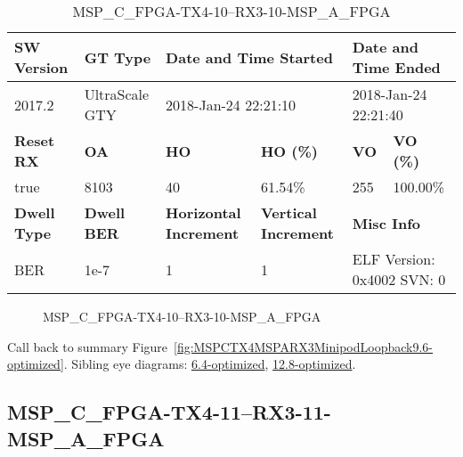 \begin{table}[h]
\centering
\caption{MSP\_C\_FPGA-TX4-10--RX3-10-MSP\_A\_FPGA}
\label{tab:MSPCFPGATX410RX310MSPAFPGA9.6-optimized}
\begin{tabular}{@{}|l|l|l|l|l|l|@{}}
\toprule
\textbf{SW Version}                & \textbf{GT Type}   & \multicolumn{2}{l|}{\textbf{Date and Time Started}}            & \multicolumn{2}{l|}{\textbf{Date and Time Ended}}        \\ \midrule
2017.2                       & UltraScale GTY          & \multicolumn{2}{l|}{2018-Jan-24 22:21:10}                   & \multicolumn{2}{l|}{2018-Jan-24 22:21:40}               \\ \midrule
\textbf{Reset RX}                  & \textbf{OA} & \textbf{HO}   & \textbf{HO (\%)} & \textbf{VO} & \textbf{VO (\%)} \\ \midrule
true & 8103        & 40          & 61.54\%        & 255        & 100.00\%       \\ \midrule
\textbf{Dwell Type}                & \textbf{Dwell BER} & \textbf{Horizontal Increment} & \textbf{Vertical Increment}    & \multicolumn{2}{l|}{\textbf{Misc Info}}                  \\ \midrule
BER                            & 1e-7        & 1        & 1           & \multicolumn{2}{l|}{ELF Version: 0x4002 SVN: 0}                         \\ \bottomrule
\end{tabular}
\end{table}

\begin{figure}[h]
\caption{MSP\_C\_FPGA-TX4-10--RX3-10-MSP\_A\_FPGA} \label{fig:MSPCFPGATX410RX310MSPAFPGA9.6-optimized}
\end{figure}

Call back to summary Figure~\ref{fig:MSPCTX4MSPARX3MinipodLoopback9.6-optimized}.
Sibling eye diagrams: \hyperref[sec:MSPCFPGATX410RX310MSPAFPGA6.4-optimized]{6.4-optimized}, \hyperref[sec:MSPCFPGATX410RX310MSPAFPGA12.8-optimized]{12.8-optimized}.

\clearpage
\newpage


\subsection{MSP\_C\_FPGA-TX4-11--RX3-11-MSP\_A\_FPGA}\label{sec:MSPCFPGATX411RX311MSPAFPGA9.6-optimized}

